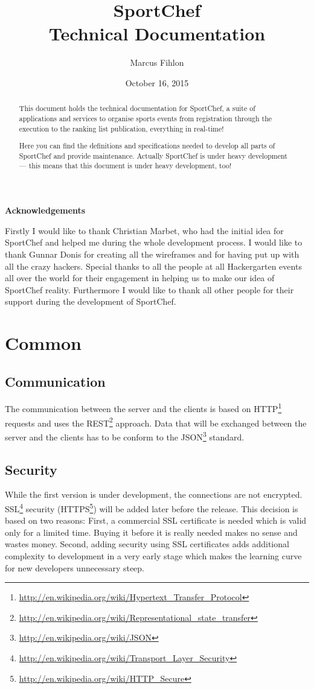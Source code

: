 \documentclass[a4paper,openright,twoside]{report}
\title{\huge SportChef \\[0.25cm] \LARGE Technical Documentation}
\author{Marcus Fihlon}
\date{October 16, 2015}
\makeatletter
\newcommand\ackname{Acknowledgements}
\newenvironment{acknowledgements}{%
      \titlepage
      \null\vfil
      \@beginparpenalty\@lowpenalty
      \begin{center}%
        \bfseries \ackname
        \@endparpenalty\@M
      \end{center}}%
     {\par\vfil\null\endtitlepage}
\newenvironment{acknowledgements}{%
      \if@twocolumn
        \section*{\abstractname}%
      \else
        \small
        \begin{center}%
          {\bfseries \ackname\vspace{-.5em}\vspace{\z@}}%
        \end{center}%
        \quotation
      \fi}
      {\if@twocolumn\else\endquotation\fi}
\makeatother
\begin{document}
\maketitle
\newpage

\begin{abstract}
This document holds the technical documentation for SportChef, a suite of applications and services to organise sports events from registration through the execution to the ranking list publication, everything in real-time!

Here you can find the definitions and specifications needed to develop all parts of SportChef and provide maintenance. Actually SportChef is under heavy development --- this means that this document is under heavy development, too!
\end{abstract}
\newpage

\begin{acknowledgements}
Firstly I would like to thank Christian Marbet, who had the initial idea for SportChef and helped me during the whole development process. I would like to thank Gunnar Donis for creating all the wireframes and for having put up with all the crazy hackers. Special thanks to all the people at all Hackergarten events all over the world for their engagement in helping us to make our idea of SportChef reality. Furthermore I would like to thank all other people for their support during the development of SportChef.
\end{acknowledgements}
\newpage

\tableofcontents
\newpage

\chapter{Common}

\section{Communication}\label{sec:Communication}
The communication between the server and the clients is based on HTTP\footnote{\url{http://en.wikipedia.org/wiki/Hypertext_Transfer_Protocol}} requests and uses the REST\footnote{\url{http://en.wikipedia.org/wiki/Representational_state_transfer}} approach. Data that will be exchanged between the server and the clients has to be conform to the JSON\footnote{\url{http://en.wikipedia.org/wiki/JSON}} standard.

\section{Security}
While the first version is under development, the connections are not encrypted. SSL\footnote{\url{http://en.wikipedia.org/wiki/Transport_Layer_Security}} security (HTTPS\footnote{\url{http://en.wikipedia.org/wiki/HTTP_Secure}}) will be added later before the release. This decision is based on two reasons: First, a commercial SSL certificate is needed which is valid only for a limited time. Buying it before it is really needed makes no sense and wastes money. Second, adding security using SSL certificates adds additional complexity to development in a very early stage which makes the learning curve for new developers unnecessary steep.
\end{document}
